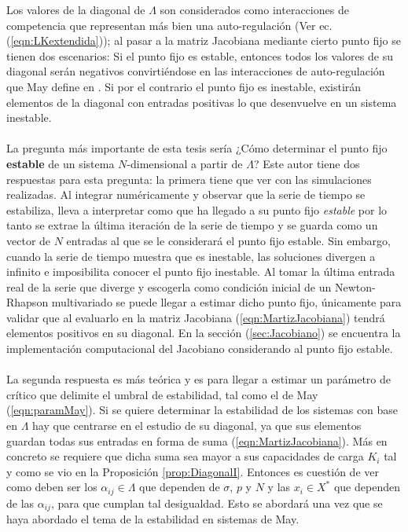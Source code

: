 Los valores de la diagonal de $\Lambda$ son considerados como interacciones de competencia que representan más bien una auto-regulación (Ver ec. (\ref{eqn:LKextendida})); al pasar a la matriz Jacobiana mediante cierto punto fijo se tienen dos escenarios: Si el punto fijo es estable, entonces todos los valores de su diagonal serán negativos convirtiéndose en las interacciones de auto-regulación que May define en \cite{may1972will}. Si por el contrario el punto fijo es inestable, existirán elementos de la diagonal con entradas positivas lo que desenvuelve en un sistema inestable.\\
\\
La pregunta más importante de esta tesis sería ¿Cómo determinar el punto fijo \textbf{estable} de un sistema $N$-dimensional a partir de $\Lambda$? Este autor tiene dos respuestas para esta pregunta: la primera tiene que ver con las simulaciones realizadas. Al integrar numéricamente y observar que la serie de tiempo se estabiliza, lleva a interpretar como que ha llegado a su punto fijo \textit{estable} por lo tanto se extrae la última iteración de la serie de tiempo y se guarda como un vector de $N$ entradas al que se le considerará el punto fijo estable. Sin embargo, cuando la serie de tiempo muestra que es inestable, las soluciones divergen a infinito e imposibilita conocer el punto fijo inestable. Al tomar la última entrada real de la serie que diverge y escogerla como condición inicial de un Newton-Rhapson multivariado se puede llegar a estimar dicho punto fijo, únicamente para validar que al evaluarlo en la matriz Jacobiana (\ref{eqn:MartizJacobiana}) tendrá elementos positivos en su diagonal.  En la sección (\ref{sec:Jacobiano}) se encuentra la implementación computacional del Jacobiano considerando al punto fijo estable.\\
\\
La segunda respuesta es más teórica y es para llegar a estimar un parámetro de crítico que delimite el umbral de estabilidad, tal como el de May (\ref{eqn:paramMay}). Si se quiere determinar la estabilidad de los sistemas con base en $\Lambda$ hay que centrarse en el estudio de su diagonal, ya que sus elementos guardan todas sus entradas en forma de suma (\ref{eqn:MartizJacobiana}). Más en concreto se requiere que dicha suma sea mayor a sus capacidades de carga $K_i$ tal y como se vio en la Proposición \ref{prop:DiagonalI}. Entonces es cuestión de ver como deben ser los $\alpha_{ij}\in\Lambda$ que dependen de $\sigma$, $p$ y $N$ y las $x_i\in X^*$ que dependen de las $\alpha_{ij}$, para que cumplan tal desigualdad. Esto se abordará una vez que se haya abordado el tema de la estabilidad en sistemas de May.


